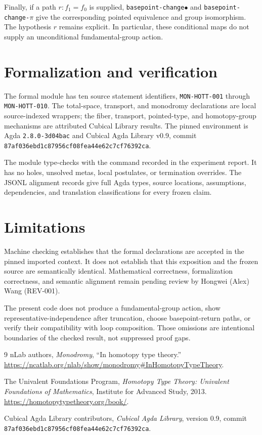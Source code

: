 \documentclass[11pt,reqno]{amsart}
\theoremstyle{mytheorem}
\theoremstyle{mydefinition}
\newcommand{\ag}[1]{\texttt{#1}}
\begin{document}
Finally, if a path $r:f_1=f_0$ is supplied,
\ag{basepoint-change}\ensuremath{\bullet} and
\ag{basepoint-change-}\ensuremath{\pi} give the corresponding pointed
equivalence and group isomorphism.  The hypothesis $r$ remains explicit.  In particular, these
conditional maps do not supply an unconditional fundamental-group action.

\section{Formalization and verification}

The formal module has ten source statement identifiers, \ag{MON-HOTT-001}
through \ag{MON-HOTT-010}.  The total-space, transport, and monodromy
declarations are local source-indexed wrappers; the fiber, transport,
pointed-type, and homotopy-group mechanisms are attributed Cubical Library
results.  The pinned environment is Agda \ag{2.8.0-3d04bac} and Cubical Agda
Library v0.9, commit
\ag{87af036ebd1c87956cf08fea44e62c7cf76392ca}.

The module type-checks with the command recorded in the experiment report.
It has no holes, unsolved metas, local postulates, or termination overrides.
The JSONL alignment records give full Agda types, source locations, assumptions,
dependencies, and translation classifications for every frozen claim.

\section{Limitations}

Machine checking establishes that the formal declarations are accepted in the
pinned imported context.  It does not establish that this exposition and the
frozen source are semantically identical.  Mathematical correctness,
formalization correctness, and semantic alignment remain pending review by
Hongwei (Alex) Wang (REV-001).

The present code does not produce a fundamental-group action, show
representative-independence after truncation, choose basepoint-return paths,
or verify their compatibility with loop composition.  Those omissions are
intentional boundaries of the checked result, not suppressed proof gaps.

\begin{thebibliography}{9}
nLab authors, \emph{Monodromy}, ``In homotopy type theory.''
\newblock \url{https://ncatlab.org/nlab/show/monodromy#InHomotopyTypeTheory}.

The Univalent Foundations Program, \emph{Homotopy Type Theory: Univalent
Foundations of Mathematics}, Institute for Advanced Study, 2013.
\newblock \url{https://homotopytypetheory.org/book/}.

Cubical Agda Library contributors, \emph{Cubical Agda Library}, version 0.9,
commit \texttt{87af036ebd1c87956cf08fea44e62c7cf76392ca}.
\end{thebibliography}
\end{document}
